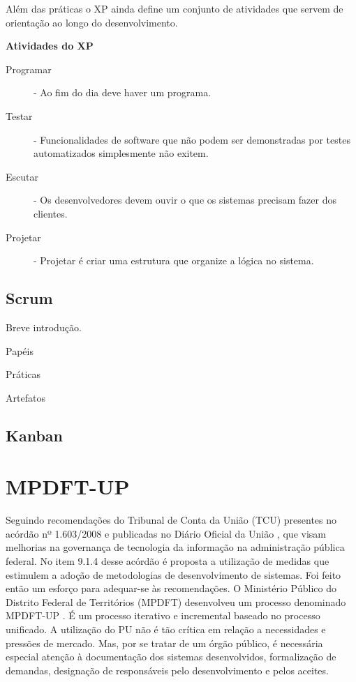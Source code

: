 \documentclass[
	article,			%
	11pt,				%
	oneside,			%
	a4paper,			%
	english,			%
	brazil,				%
	sumario=tradicional
	]{abntex2}
\begin{document}
Além das práticas o XP ainda define um conjunto de atividades que servem de
orientação ao longo do desenvolvimento.

\textbf{Atividades do XP}

\begin{description}
   \item[Programar] - Ao fim do dia deve haver um programa.
   \item[Testar] - Funcionalidades de software que não podem ser demonstradas
   por testes automatizados simplesmente não exitem.
   \item[Escutar] - Os desenvolvedores devem ouvir o que os sistemas precisam
   fazer dos clientes.
   \item[Projetar] - Projetar é criar uma estrutura que organize a lógica no
   sistema.
\end{description}

\subsection{Scrum}

Breve introdução.

Papéis

Práticas

Artefatos

\subsection{Kanban}



\section{MPDFT-UP}

Seguindo recomendações do Tribunal de Conta da União (TCU) presentes no acórdão
nº 1.603/2008 \cite{acordao-tcu-1603-2008} e publicadas no Diário Oficial da União
\cite{dou-20080818}, que visam melhorias na governança de tecnologia da
informação na administração pública federal. No item 9.1.4 desse acórdão é
proposta a utilização de medidas que estimulem a adoção de metodologias de
desenvolvimento de sistemas. Foi feito então um esforço para adequar-se às
recomendações. O Ministério Público do Distrito Federal de Territórios (MPDFT)
desenvolveu um processo denominado MPDFT-UP \cite{mpdft-up}. É um processo
iterativo e incremental baseado no processo unificado. A utilização do PU não é
tão crítica em relação a necessidades e pressões de mercado. Mas, por se tratar
de um órgão público, é necessária especial atenção à documentação dos sistemas
desenvolvidos, formalização de demandas, designação de responsáveis pelo
desenvolvimento e pelos aceites.
\end{document}
